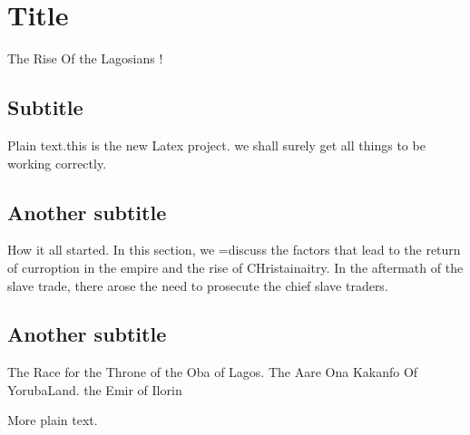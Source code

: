 \documentclass{article}
\begin{document}
\section{Title}The Rise Of the Lagosians !

\subsection{Subtitle}

Plain text.this is the new Latex project. we shall surely get all things to be
working correctly.

\subsection{Another subtitle}How it all started. In this section, we =discuss
the factors that lead to the return of curroption in the empire and the rise of
CHristainaitry. In the aftermath of the slave trade, there arose the need to
prosecute the chief slave traders.

\subsection{Another subtitle}The Race for the Throne of the Oba of Lagos. The
Aare Ona Kakanfo Of YorubaLand. the Emir of Ilorin

More plain text.
\end{document}

